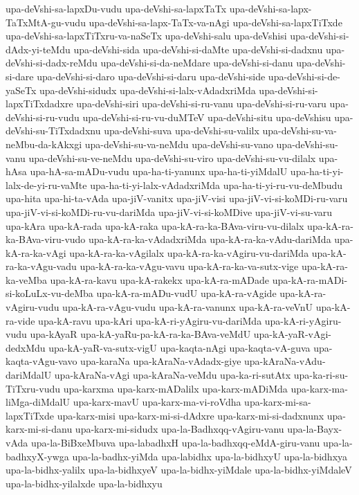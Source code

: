 {upa-deVshi-sa-lapxDu-vudu
upa-deVshi-sa-lapxTaTx
upa-deVshi-sa-lapx-TaTxMtA-gu-vudu
upa-deVshi-sa-lapx-TaTx-va-nAgi
upa-deVshi-sa-lapxTiTxde
upa-deVshi-sa-lapxTiTxru-va-naSeTx
upa-deVshi-salu
upa-deVshisi
upa-deVshi-si-dAdx-yi-teMdu
upa-deVshi-sida
upa-deVshi-si-daMte
upa-deVshi-si-dadxnu
upa-deVshi-si-dadx-reMdu
upa-deVshi-si-da-neMdare
upa-deVshi-si-danu
upa-deVshi-si-dare
upa-deVshi-si-daro
upa-deVshi-si-daru
upa-deVshi-side
upa-deVshi-si-de-yaSeTx
upa-deVshi-sidudx
upa-deVshi-si-lalx-vAdadxriMda
upa-deVshi-si-lapxTiTxdadxre
upa-deVshi-siri
upa-deVshi-si-ru-vanu
upa-deVshi-si-ru-varu
upa-deVshi-si-ru-vudu
upa-deVshi-si-ru-vu-duMTeV
upa-deVshi-situ
upa-deVshisu
upa-deVshi-su-TiTxdadxnu
upa-deVshi-suva
upa-deVshi-su-valilx
upa-deVshi-su-va-neMbu-da-kAkxgi
upa-deVshi-su-va-neMdu
upa-deVshi-su-vano
upa-deVshi-su-vanu
upa-deVshi-su-ve-neMdu
upa-deVshi-su-viro
upa-deVshi-su-vu-dilalx
upa-hAsa
upa-hA-sa-mADu-vudu
upa-ha-ti-yanunx
upa-ha-ti-yiMdalU
upa-ha-ti-yi-lalx-de-yi-ru-vaMte
upa-ha-ti-yi-lalx-vAdadxriMda
upa-ha-ti-yi-ru-vu-deMbudu
upa-hita
upa-hi-ta-vAda
upa-jiV-vanitx
upa-jiV-visi
upa-jiV-vi-si-koMDi-ru-varu
upa-jiV-vi-si-koMDi-ru-vu-dariMda
upa-jiV-vi-si-koMDive
upa-jiV-vi-su-varu
upa-kAra
upa-kA-rada
upa-kA-raka
upa-kA-ra-ka-BAva-viru-vu-dilalx
upa-kA-ra-ka-BAva-viru-vudo
upa-kA-ra-ka-vAdadxriMda
upa-kA-ra-ka-vAdu-dariMda
upa-kA-ra-ka-vAgi
upa-kA-ra-ka-vAgilalx
upa-kA-ra-ka-vAgiru-vu-dariMda
upa-kA-ra-ka-vAgu-vadu
upa-kA-ra-ka-vAgu-vavu
upa-kA-ra-ka-va-sutx-vige
upa-kA-ra-ka-veMba
upa-kA-ra-kavu
upa-kA-rakekx
upa-kA-ra-mADade
upa-kA-ra-mADi-si-koLuLx-vu-deMba
upa-kA-ra-mADu-vudU
upa-kA-ra-vAgide
upa-kA-ra-vAgiru-vudu
upa-kA-ra-vAgu-vudu
upa-kA-ra-vanunx
upa-kA-ra-veVnU
upa-kA-ra-vide
upa-kA-ravu
upa-kAri
upa-kA-ri-yAgiru-vu-dariMda
upa-kA-ri-yAgiru-vudu
upa-kAyaR
upa-kA-yaRu-pa-kA-ra-ka-BAva-veMdU
upa-kA-yaR-vAgi-dedxMdu
upa-kA-yaR-va-sutx-vigU
upa-kaqta-nAgi
upa-kaqta-vA-guva
upa-kaqta-vAgu-vavo
upa-karaNa
upa-kAraNa-vAdadx-giye
upa-kAraNa-vAdu-dariMdalU
upa-kAraNa-vAgi
upa-kAraNa-veMdu
upa-ka-ri-sutAtx
upa-ka-ri-su-TiTxru-vudu
upa-karxma
upa-karx-mADalilx
upa-karx-mADiMda
upa-karx-ma-liMga-diMdalU
upa-karx-mavU
upa-karx-ma-vi-roVdha
upa-karx-mi-sa-lapxTiTxde
upa-karx-misi
upa-karx-mi-si-dAdxre
upa-karx-mi-si-dadxnunx
upa-karx-mi-si-danu
upa-karx-mi-sidudx
upa-la-Badhxqq-vAgiru-vanu
upa-la-Bayx-vAda
upa-la-BiBxeMbuva
upa-labadhxH
upa-la-badhxqq-eMdA-giru-vanu
upa-la-badhxyX-ywga
upa-la-badhx-yiMda
upa-labidhx
upa-la-bidhxyU
upa-la-bidhxya
upa-la-bidhx-yalilx
upa-la-bidhxyeV
upa-la-bidhx-yiMdale
upa-la-bidhx-yiMdaleV
upa-la-bidhx-yilalxde
upa-la-bidhxyu
}
